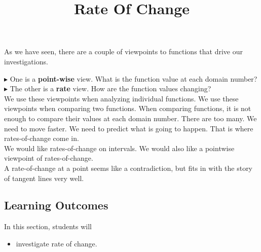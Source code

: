 \documentclass{ximera}
\title{Rate Of Change}
\begin{document}
\begin{abstract}
\end{abstract}
\maketitle







As we have seen, there are a couple of viewpoints to functions that drive our investigations.

$\blacktriangleright$ One is a \textbf{point-wise} view.  What is the function value at each domain number? \\


$\blacktriangleright$ The other is a \textbf{rate} view.  How are the function values changing? \\



We use these viewpoints when analyzing individual functions.  We use these viewpoints when comparing two functions. When comparing functions, it is not enough to compare their values at each domain number.  There are too many.  We need to move faster.  We need to predict what is going to happen. That is where rates-of-change come in. \\




We would like rates-of-change on intervals.  We would also like a pointwise viewpoint of rates-of-change. \\



A rate-of-change at a point seems like a contradiction, but fits in with the story of tangent lines very well.













\subsection{Learning Outcomes}


\begin{sectionOutcomes}
In this section, students will 

\begin{itemize}
\item investigate rate of change.

\end{itemize}
\end{sectionOutcomes}
\end{document}
